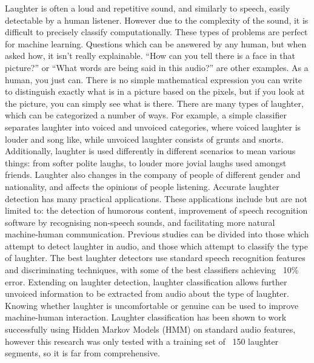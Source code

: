 \documentclass[a4paper,11pt,notitlepage]{article}
\begin{document}
Laughter is often a loud and repetitive sound, and similarly to speech, easily detectable by a human listener. However due to the complexity of the sound, it is difficult to precisely classify computationally. These types of problems are perfect for machine learning. Questions which can be answered by any human, but when asked how, it isn't really explainable. ``How can you tell there is a face in that picture?'' or ``What words are being said in this audio?'' are other examples. As a human, you just can. There is no simple mathematical expression you can write to distinguish exactly what is in a picture based on the pixels, but if you look at the picture, you can simply see what is there. There are many types of laughter, which can be categorized a number of ways. For example, a simple classifier separates laughter into voiced and unvoiced categories, where voiced laughter is louder and song like, while unvoiced laughter consists of grunts and snorts. Additionally, laughter is used differently in different scenarios to mean various things: from softer polite laughs, to louder more jovial laughs used amongst friends.\cite{tanaka2011acoustic} Laughter also changes in the company of people of different gender and nationality,\cite{campbell2007whom} and affects the opinions of people listening.\cite{bachorowski2001not} Accurate laughter detection has many practical applications. These applications include but are not limited to: the detection of humorous content, improvement of speech recognition software by recognising non-speech sounds, and facilitating more natural machine-human communication. Previous studies can be divided into those which attempt to detect laughter in audio, and those which attempt to classify the type of laughter. The best laughter detectors use standard speech recognition features and discriminating techniques\cite{cosentino2016quantitative}, with some of the best classifiers achieving ~10\% error.\cite{gosztolya2016laughter,knox2007automatic,truong2007automatic,truong2005automatic} Extending on laughter detection, laughter classification allows further unvoiced information to be extracted from audio about the type of laughter. Knowing whether laughter is uncomfortable or genuine can be used to improve machine-human interaction. Laughter classification has been shown to work successfully using Hidden Markov Models (HMM) on standard audio features\cite{tanaka2011acoustic}, however this research was only tested with a training set of ~150 laughter segments, so it is far from comprehensive.\\
\\
\end{document}
